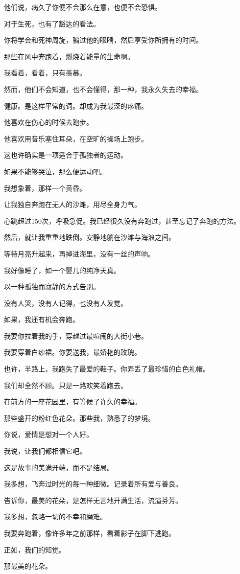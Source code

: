 \documentclass[12pt,a4paper]{article}
\begin{document}
		他们说，病久了你便不会那么在意，也便不会恐惧。\par
		对于生死，也有了豁达的看法。\par
		你将学会和死神周旋，骗过他的眼睛，然后享受你所拥有的时间。\par
		那些在风中奔跑着，燃烧着能量的生命啊。\par
		我看着，看着，只有羡慕。\par
		然而，他们不会知道，也不会懂得，那一种，我永久失去的幸福。\par
		健康。是这样平常的词。却成为我最深的疼痛。\par
		他喜欢在伤心的时候去跑步。\par
		他喜欢用音乐塞住耳朵，在空旷的操场上跑步。\par
		这也许确实是一项适合于孤独者的运动。\par
		如果不能够哭泣，那么便运动吧。\par
		我想象着，那样一个黄昏。\par
		让我独自奔跑在无人的沙滩，用尽全身力气。\par
		心跳超过150次，呼吸急促。我已经很久没有奔跑过，甚至忘记了奔跑的方法。\par
		然后，就让我重重地跌倒。安静地躺在沙滩与海浪之间。\par
		等待月亮升起来，再掉进海里，没有一丝的声响。\par
		我好像睡了，如一个婴儿的纯净天真。\par
		以一种孤独而寂静的方式告别。\par
		没有人哭，没有人记得，也没有人发觉。\par
		如果，我还有机会奔跑。\par
		我要你拉着我的手，穿越过最喧闹的大街小巷。\par
		我要穿着白纱裙。你要送我，最娇艳的玫瑰。\par
		也许，半路上，我跑失了最爱的鞋子。你弄丢了最珍惜的白色礼帽。\par
		我们却全然不顾。只是一路欢笑着跑去。\par
		在前方的一座花园里，有等候了许久的幸福。\par
		那些盛开的粉红色花朵。那些我，熟悉了的梦境。\par
		你说，爱情是想对一个人好。\par
		我说，让我们都相信它吧。\par
		这是故事的美满开端，而不是结局。\par
		我多想，飞奔过时光的每一种细微。记录着所有爱与善良。\par
		告诉你，最美的花朵，是怎样无言地开满生活，流溢芬芳。\par
		我多想，忽略一切的不幸和磨难。\par
		我要奔跑着，像许多年之前那样，看着影子在脚下逃跑。\par
		正如，我们的知觉。\par
		那最美的花朵。
\end{document}

